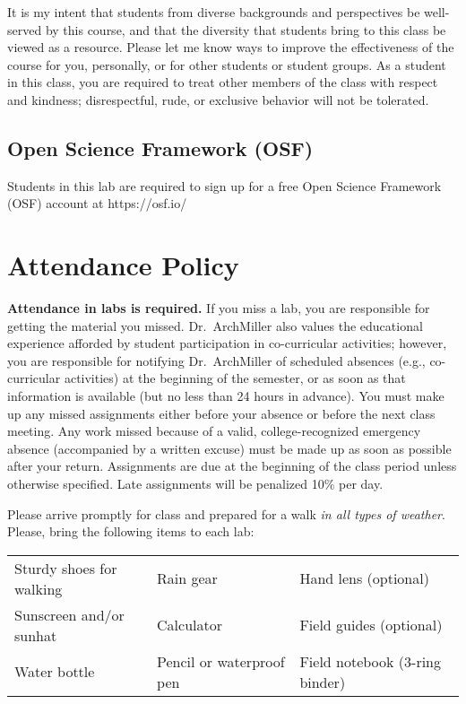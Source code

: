 \documentclass{tufte-handout}
\begin{document}
\begin{fullwidth}
It is my intent that students from diverse backgrounds and perspectives be well-served by this course, and that the diversity that students bring to this class be viewed as a resource. Please let me know ways to improve the effectiveness of the course for you, personally, or for other students or student groups. As a student in this class, you are required to treat other members of the class with respect and kindness; disrespectful, rude, or exclusive behavior will not be tolerated.

\subsection{Open Science Framework (OSF)} 											%

Students in this lab are required to sign up for a free Open Science Framework (OSF) account at https://osf.io/

\section{Attendance Policy}

\textbf{Attendance in labs is required.} If you miss a lab, you are responsible for getting the material you missed. Dr.~ArchMiller also values the educational experience afforded by student participation in co-curricular activities; however, you are responsible for notifying Dr.~ArchMiller of scheduled absences (e.g., co-curricular activities) at the beginning of the semester, or as soon as that information is available (but no less than 24 hours in advance). You must make up any missed assignments either before your absence or before the next class meeting. Any work missed because of a valid, college-recognized emergency absence (accompanied by a written excuse) must be made up as soon as possible after your return. Assignments are due at the beginning of the class period unless otherwise specified. Late assignments will be penalized 10\% per day.

 Please arrive promptly for class and prepared for a walk \emph{in all types of weather}. Please, bring the following items to each lab:

\begin{tabular}{lll}
Sturdy shoes for walking & Rain gear & Hand lens (optional)\\
Sunscreen and/or sunhat & Calculator & Field guides (optional)\\
Water bottle & Pencil or waterproof pen & Field notebook (3-ring binder)
\end{tabular}



\end{fullwidth}
\end{document}
